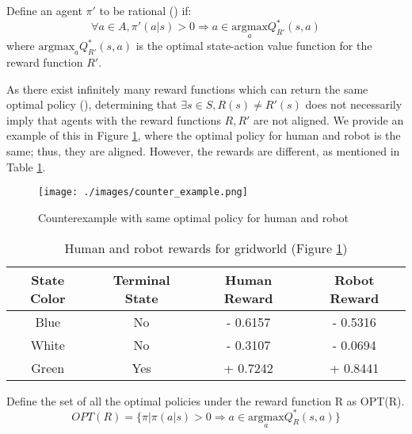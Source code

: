 \begin{defn}
    Define an agent $\pi'$ to be rational (\cite{russell2002artificial}) if:
    \begin{equation}
    \label{eqn:rational-agent}
        \forall a \in A, \pi'(a|s) > 0 \Rightarrow a \in \underset{a}{\mathrm{argmax}} Q^*_{R'}(s,a)
    \end{equation}    
    where $\mathrm{argmax}_a Q^*_{R'}(s,a)$ is the optimal state-action value function for the reward function $R'$.
\end{defn}

As there exist infinitely many reward functions which can return the same optimal policy (\cite{ng2000algorithms}), determining  that $\exists s \in S, R(s) \neq R'(s)$ does not necessarily imply that agents with the reward functions $R, R'$ are not aligned. We provide an example of this in Figure \ref{fig:counter_example}, where the optimal policy for human and robot is the same; thus, they are aligned. However, the rewards are different, as mentioned in Table \ref{tab:human_robot_rewards}.

\begin{figure}[!ht]
    \centering
    \texttt{[image: ./images/counter\_example.png]}
    \caption{Counterexample with same optimal policy for human and robot}
    \label{fig:counter_example}
\end{figure}
\vspace{-5mm}
\begin{table}[!ht]
  \caption{Human and robot rewards for gridworld (Figure \ref{fig:counter_example})}
  \label{tab:human_robot_rewards}
  \centering
  \begin{tabular}{cccc}
    \toprule
    State Color     & Terminal State     & Human Reward & Robot Reward \\
    \midrule
    Blue & No  &  - 0.6157 & - 0.5316    \\
    White     & No &  - 0.3107  & - 0.0694    \\
    Green     & Yes & + 0.7242 & + 0.8441 \\
    \bottomrule
  \end{tabular}
\end{table}

\begin{defn}
    Define the set of all the optimal policies under the reward function R as OPT(R).
    \[
        OPT(R) = \{ \pi | \pi(a|s) > 0 \Rightarrow a \in \underset{a}{\mathrm{argmax}} Q^*_{R}(s,a) \}
    \]
\end{defn}

